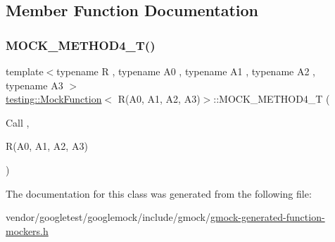 \subsection{Member Function Documentation}
\mbox{\label{classtesting_1_1_mock_function_3_01_r_07_a0_00_01_a1_00_01_a2_00_01_a3_08_4_ad158c25a1b33cb53bae3f0eb9df0d59c}} 
\subsubsection{\texorpdfstring{M\+O\+C\+K\+\_\+\+M\+E\+T\+H\+O\+D4\+\_\+\+T()}{MOCK\_METHOD4\_T()}}
{\footnotesize\ttfamily template$<$typename R , typename A0 , typename A1 , typename A2 , typename A3 $>$ \\
\hyperlink{classtesting_1_1_mock_function}{testing\+::\+Mock\+Function}$<$ R(A0, A1, A2, A3)$>$\+::M\+O\+C\+K\+\_\+\+M\+E\+T\+H\+O\+D4\+\_\+T (\begin{DoxyParamCaption}\item[{Call}]{,  }\item[{R(A0, A1, A2, A3)}]{ }\end{DoxyParamCaption})}



The documentation for this class was generated from the following file\+:\begin{DoxyCompactItemize}
\item 
vendor/googletest/googlemock/include/gmock/\hyperlink{gmock-generated-function-mockers_8h}{gmock-\/generated-\/function-\/mockers.\+h}\end{DoxyCompactItemize}
